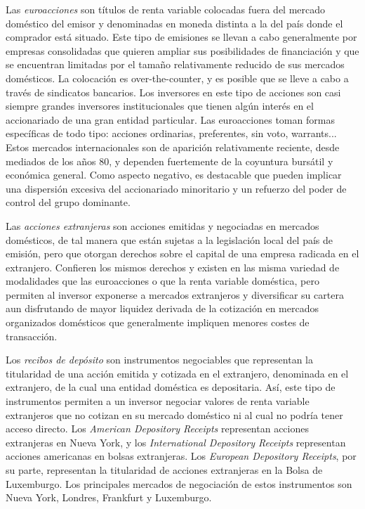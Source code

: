 \documentclass{nuevotema}
\begin{document}
Las \textit{euroacciones} son títulos de renta variable colocadas fuera del mercado doméstico del emisor y denominadas en moneda distinta a la del país donde el comprador está situado. Este tipo de emisiones se llevan a cabo generalmente por empresas consolidadas que quieren ampliar sus posibilidades de financiación y que se encuentran limitadas por el tamaño relativamente reducido de sus mercados domésticos. La colocación es over-the-counter, y es posible que se lleve a cabo a través de sindicatos bancarios. Los inversores en este tipo de acciones son casi siempre grandes inversores institucionales que tienen algún interés en el accionariado de una gran entidad particular. Las euroacciones toman formas específicas de todo tipo: acciones ordinarias, preferentes, sin voto, warrants... Estos mercados internacionales son de aparición relativamente reciente, desde mediados de los años 80, y dependen fuertemente de la coyuntura bursátil y económica general. Como aspecto negativo, es destacable que pueden implicar una dispersión excesiva del accionariado minoritario y un refuerzo del poder de control del grupo dominante. 

Las \textit{acciones extranjeras} son acciones emitidas y negociadas en mercados domésticos, de tal manera que están sujetas a la legislación local del país de emisión, pero que otorgan derechos sobre el capital de una empresa radicada en el extranjero. Confieren los mismos derechos y existen en las misma variedad de modalidades que las euroacciones o que la renta variable doméstica, pero permiten al inversor exponerse a mercados extranjeros y diversificar su cartera aun disfrutando de mayor liquidez derivada de la cotización en mercados organizados domésticos que generalmente impliquen menores costes de transacción. 

Los \textit{recibos de depósito} son instrumentos negociables que representan la titularidad de una acción emitida y cotizada en el extranjero, denominada en el extranjero, de la cual una entidad doméstica es depositaria. Así, este tipo de instrumentos permiten a un inversor negociar valores de renta variable extranjeros que no cotizan en su mercado doméstico ni al cual no podría tener acceso directo. Los \textit{American Depository Receipts} representan acciones extranjeras en Nueva York, y los \textit{International Depository Receipts} representan acciones americanas en bolsas extranjeras. Los \textit{European Depository Receipts}, por su parte, representan la titularidad de acciones extranjeras en la Bolsa de Luxemburgo. Los principales mercados de negociación de estos instrumentos son Nueva York, Londres, Frankfurt y Luxemburgo.
\end{document}
